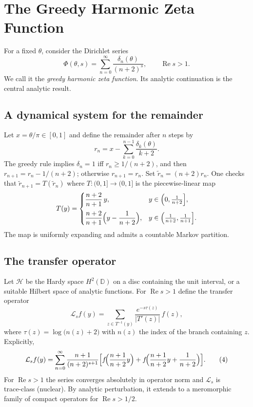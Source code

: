\documentclass[11pt,a4paper]{article}
\theoremstyle{remark}
\begin{document}
\section{The Greedy Harmonic Zeta Function}

For a fixed \(\theta\), consider the Dirichlet series
\begin{equation}\label{eq:Phi}
\Phi(\theta,s)=\sum_{n=0}^{\infty}\frac{\delta_n(\theta)}{(n+2)^s},\qquad \operatorname{Re}s>1.
\end{equation}
We call it the \emph{greedy harmonic zeta function}. Its analytic continuation is the central analytic result.

\subsection{A dynamical system for the remainder}
Let \(x=\theta/\pi\in[0,1]\) and define the remainder after \(n\) steps by
\[
r_n = x - \sum_{k=0}^{n-1}\frac{\delta_k(\theta)}{k+2}.
\]
The greedy rule implies \(\delta_n=1\) iff \(r_n\ge 1/(n+2)\), and then \(r_{n+1}=r_n-1/(n+2)\); otherwise \(r_{n+1}=r_n\). Set \(\widetilde{r}_n=(n+2)r_n\). One checks that \(\widetilde{r}_{n+1}=T(\widetilde{r}_n)\) where \(T:(0,1]\to(0,1]\) is the piecewise‑linear map
\begin{equation}\label{eq:Tmap}
T(y)=
\begin{cases}
\displaystyle\frac{n+2}{n+1}\,y, & y\in\Bigl(0,\frac{1}{n+2}\Bigr],\\[10pt]
\displaystyle\frac{n+2}{n+1}\Bigl(y-\frac{1}{n+2}\Bigr), & y\in\Bigl(\frac{1}{n+2},\frac{1}{n+1}\Bigr].
\end{cases}
\end{equation}
The map is uniformly expanding and admits a countable Markov partition.

\subsection{The transfer operator}
Let \(\mathcal{H}\) be the Hardy space \(H^2(\mathbb{D})\) on a disc containing the unit interval, or a suitable Hilbert space of analytic functions. For \(\operatorname{Re}s>1\) define the transfer operator
\begin{equation}\label{eq:transfer}
\mathcal{L}_s f(y)=\sum_{z\in T^{-1}(y)}\frac{e^{-s\tau(z)}}{|T'(z)|}\,f(z),
\end{equation}
where \(\tau(z)=\log\bigl(n(z)+2\bigr)\) with \(n(z)\) the index of the branch containing \(z\). Explicitly,
\[
\mathcal{L}_s f(y)=\sum_{n=0}^{\infty}\frac{n+1}{(n+2)^{s+1}}
\Bigl[ f\!\Bigl(\frac{n+1}{n+2}y\Bigr)+
        f\!\Bigl(\frac{n+1}{n+2}y+\frac{1}{n+2}\Bigr) \Bigr].
\tag{4}
\]
For \(\operatorname{Re}s>1\) the series converges absolutely in operator norm and \(\mathcal{L}_s\) is trace‑class (nuclear). By analytic perturbation, it extends to a meromorphic family of compact operators for \(\operatorname{Re}s>1/2\).
\end{document}
